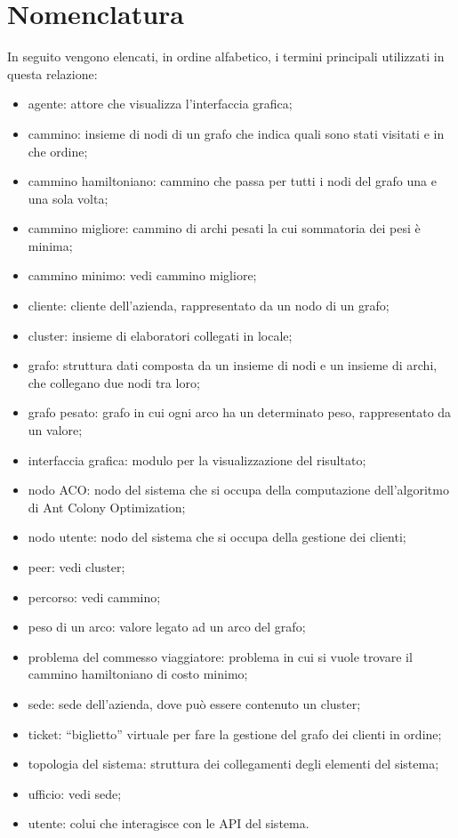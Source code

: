 \chapter{Nomenclatura}
In seguito vengono elencati, in ordine alfabetico, i termini principali utilizzati in questa relazione:
\begin{itemize}
    \item agente: attore che visualizza l'interfaccia grafica;
    \item cammino: insieme di nodi di un grafo che indica quali sono stati visitati e in che ordine;
    \item cammino hamiltoniano: cammino che passa per tutti i nodi del grafo una e una sola volta;
    \item cammino migliore: cammino di archi pesati la cui sommatoria dei pesi è minima;
    \item cammino minimo: vedi cammino migliore;
    \item cliente: cliente dell'azienda, rappresentato da un nodo di un grafo;
    \item cluster: insieme di elaboratori collegati in locale;
    \item grafo: struttura dati composta da un insieme di nodi e un insieme di archi, che collegano due nodi tra loro;
    \item grafo pesato: grafo in cui ogni arco ha un determinato peso, rappresentato da un valore;
    \item interfaccia grafica: modulo per la visualizzazione del risultato;
    \item nodo ACO: nodo del sistema che si occupa della computazione dell'algoritmo di Ant Colony Optimization;
    \item nodo utente: nodo del sistema che si occupa della gestione dei clienti;
    \item peer: vedi cluster;
    \item percorso: vedi cammino;
    \item peso di un arco: valore legato ad un arco del grafo;
    \item problema del commesso viaggiatore: problema in cui si vuole trovare il cammino hamiltoniano di costo minimo;
    \item sede: sede dell'azienda, dove può essere contenuto un cluster;
    \item ticket: ``biglietto'' virtuale per fare la gestione del grafo dei clienti in ordine;
    \item topologia del sistema: struttura dei collegamenti degli elementi del sistema;
    \item ufficio: vedi sede;
    \item utente: colui che interagisce con le API del sistema.
\end{itemize}